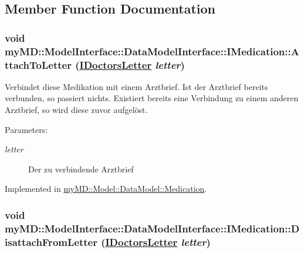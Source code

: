\subsection{Member Function Documentation}
\hypertarget{interfacemy_m_d_1_1_model_interface_1_1_data_model_interface_1_1_i_medication_4e9eb33eb2d50445faed1fb21b100083}{
\subsubsection[AttachToLetter]{\setlength{\rightskip}{0pt plus 5cm}void my\-MD::Model\-Interface::Data\-Model\-Interface::IMedication::Attach\-To\-Letter (\hyperlink{interfacemy_m_d_1_1_model_interface_1_1_data_model_interface_1_1_i_doctors_letter}{IDoctors\-Letter} {\em letter})}}
\label{d2/dce/interfacemy_m_d_1_1_model_interface_1_1_data_model_interface_1_1_i_medication_4e9eb33eb2d50445faed1fb21b100083}


Verbindet diese Medikation mit einem Arztbrief. Ist der Arztbrief bereits verbunden, so passiert nichts. Existiert bereits eine Verbindung zu einem anderen Arztbrief, so wird diese zuvor aufgel\"{o}st. 

\begin{Desc}
\item[Parameters:]
\begin{description}
\item[{\em letter}]Der zu verbindende Arztbrief\end{description}
\end{Desc}


Implemented in \hyperlink{classmy_m_d_1_1_model_1_1_data_model_1_1_medication_4e9eb33eb2d50445faed1fb21b100083}{my\-MD::Model::Data\-Model::Medication}.\hypertarget{interfacemy_m_d_1_1_model_interface_1_1_data_model_interface_1_1_i_medication_d1ca6f76b75fe87eac94cbac8bc61322}{
\subsubsection[DisattachFromLetter]{\setlength{\rightskip}{0pt plus 5cm}void my\-MD::Model\-Interface::Data\-Model\-Interface::IMedication::Disattach\-From\-Letter (\hyperlink{interfacemy_m_d_1_1_model_interface_1_1_data_model_interface_1_1_i_doctors_letter}{IDoctors\-Letter} {\em letter})}}
\label{d2/dce/interfacemy_m_d_1_1_model_interface_1_1_data_model_interface_1_1_i_medication_d1ca6f76b75fe87eac94cbac8bc61322}


